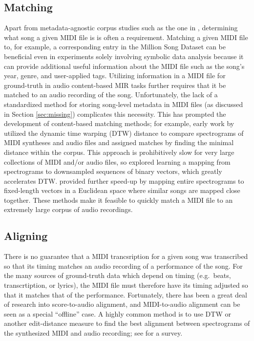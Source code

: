 \documentclass{article}
\begin{document}
\subsection{Matching}

Apart from metadata-agnostic corpus studies such as the one in \cite{mauch2012corpus}, determining what song a given MIDI file is is often a requirement.
Matching a given MIDI file to, for example, a corresponding entry in the Million Song Dataset \cite{bertin2011million} can be beneficial even in experiments solely involving symbolic data analysis because it can provide additional useful information about the MIDI file such as the song's year, genre, and user-applied tags.
Utilizing information in a MIDI file for ground-truth in audio content-based MIR tasks further requires that it be matched to an audio recording of the song.
Unfortunately, the lack of a standardized method for storing song-level metadata in MIDI files (as discussed in Section \ref{sec:missing}) complicates this necessity.
This has prompted the development of content-based matching methods; for example, early work by \cite{hu2003polyphonic} utilized the dynamic time warping (DTW) distance to compare spectrograms of MIDI syntheses and audio files and assigned matches by finding the minimal distance within the corpus.
This approach is prohibitively slow for very large collections of MIDI and/or audio files, so \cite{raffel2015large} explored learning a mapping from spectrograms to downsampled sequences of binary vectors, which greatly accelerates DTW.
\cite{raffel2016pruning} provided further speed-up by mapping entire spectrograms to fixed-length vectors in a Euclidean space where similar songs are mapped close together.
These methods make it feasible to quickly match a MIDI file to an extremely large corpus of audio recordings.

\subsection{Aligning}

There is no guarantee that a MIDI trancsription for a given song was transcribed so that its timing matches an audio recording of a performance of the song.
For the many sources of ground-truth data which depend on timing (e.g.\ beats, transcrtiption, or lyrics), the MIDI file must therefore have its timing adjusted so that it matches that of the performance.
Fortunately, there has been a great deal of research into score-to-audio alignment, and MIDI-to-audio alignment can be seen as a special ``offline'' case.
A highly common method is to use DTW or another edit-distance measure to find the best alignment between spectrograms of the synthesized MIDI and audio recording; see \cite{raffel2016optimizing} for a survey.
\end{document}

